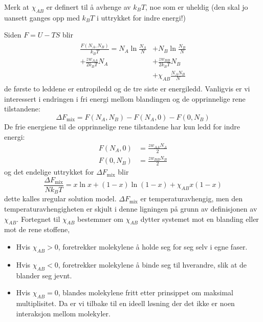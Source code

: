 Merk at $\chi_{AB}$ er definert til å avhenge av $k_BT$, noe som er uheldig (den skal jo uansett ganges opp med $k_BT$ i uttrykket for indre energi!)

Siden $F=U-TS$ blir
\begin{align}
\begin{split}
	\frac{F(N_A,N_B)}{k_BT}=N_A\ln\frac{N_A}{N}&+N_B\ln\frac{N_B}{N}\\+\frac{zw_{AA}}{2k_BT}N_A&+\frac{zw_{BB}}{2k_BT}N_B\\&+\chi_{AB}\frac{N_AN_B}{N}
\end{split}
\end{align}
de første to leddene er entropiledd og de tre siste er energiledd. Vanligvis er vi interessert i endringen i fri energi mellom blandingen og de opprinnelige rene tilstandene:
\begin{equation}
	\Delta F_{\text{mix}}=F(N_A,N_B)-F(N_A,0)-F(0,N_B)
\end{equation}
De frie energiene til de opprinnelige rene tilstandene har kun ledd for indre energi:
\begin{align}
    F(N_A,0) &= \frac{zw_{AA}N_A}{2} \\
    F(0,N_B) &= \frac{zw_{BB}N_B}{2}
\end{align}
og det endelige uttrykket for $\Delta F_{\text{mix}}$ blir 
\begin{equation}
	\frac{\Delta F_{\text{mix}}}{Nk_BT} = x\ln x + (1-x) \ln(1-x)+\chi_{AB}x(1-x)
\end{equation}
dette kalles \i{regular solution model}. $\Delta F_{\text{mix}}$ er temperaturavhengig, men den temperaturavhengigheten er skjult i denne ligningen på grunn av definisjonen av $\chi_{AB}$. Fortegnet til $\chi_{AB}$ bestemmer om $\chi_{AB}$ dytter systemet mot en blanding eller mot de rene stoffene,
\begin{itemize}[nolistsep,noitemsep]
	\item Hvis $\chi_{AB}>0$, foretrekker molekylene å holde seg for seg selv i egne faser.
	\item Hvis $\chi_{AB}<0$, foretrekker molekylene å binde seg til hverandre, slik at de blander seg jevnt.
	\item Hvis $\chi_{AB}=0$, blandes molekylene fritt etter prinsippet om maksimal multiplisitet. Da er vi tilbake til en ideell løsning der det ikke er noen interaksjon mellom molekyler.
\end{itemize}

